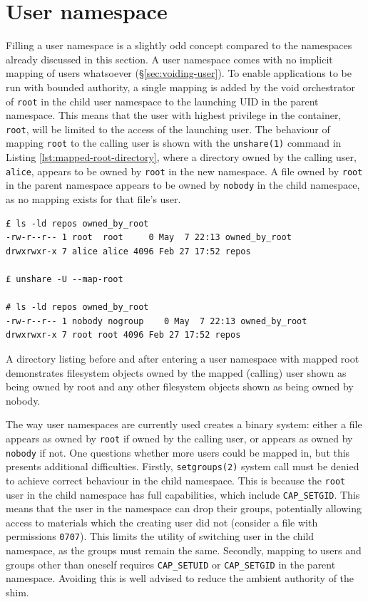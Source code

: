 \documentclass[12pt,a4paper,twoside]{report}
\begin{document}
\section{User namespace}
\label{sec:filling-user}

Filling a user namespace is a slightly odd concept compared to the namespaces already discussed in this section. A user namespace comes with no implicit mapping of users whatsoever (§\ref{sec:voiding-user}). To enable applications to be run with bounded authority, a single mapping is added by the void orchestrator of \texttt{root} in the child user namespace to the launching UID in the parent namespace. This means that the user with highest privilege in the container, \texttt{root}, will be limited to the access of the launching user. The behaviour of mapping \texttt{root} to the calling user is shown with the \texttt{unshare(1)} command in Listing \ref{lst:mapped-root-directory}, where a directory owned by the calling user, \texttt{alice}, appears to be owned by \texttt{root} in the new namespace. A file owned by \texttt{root} in the parent namespace appears to be owned by \texttt{nobody} in the child namespace, as no mapping exists for that file's user.

\begin{listing}
\begin{verbatim}
£ ls -ld repos owned_by_root
-rw-r--r-- 1 root  root     0 May  7 22:13 owned_by_root
drwxrwxr-x 7 alice alice 4096 Feb 27 17:52 repos

£ unshare -U --map-root

# ls -ld repos owned_by_root
-rw-r--r-- 1 nobody nogroup    0 May  7 22:13 owned_by_root
drwxrwxr-x 7 root root 4096 Feb 27 17:52 repos
\end{verbatim}

\caption{A directory listing before and after entering a user namespace with mapped root demonstrates filesystem objects owned by the mapped (calling) user shown as being owned by root and any other filesystem objects shown as being owned by nobody.}
\label{lst:mapped-root-directory}
\end{listing}

The way user namespaces are currently used creates a binary system: either a file appears as owned by \texttt{root} if owned by the calling user, or appears as owned by \texttt{nobody} if not. One questions whether more users could be mapped in, but this presents additional difficulties. Firstly, \texttt{setgroups(2)} system call must be denied to achieve correct behaviour in the child namespace. This is because the \texttt{root} user in the child namespace has full capabilities, which include \texttt{CAP\_SETGID}. This means that the user in the namespace can drop their groups, potentially allowing access to materials which the creating user did not (consider a file with permissions \texttt{0707}). This limits the utility of switching user in the child namespace, as the groups must remain the same. Secondly, mapping to users and groups other than oneself requires \texttt{CAP\_SETUID} or \texttt{CAP\_SETGID} in the parent namespace. Avoiding this is well advised to reduce the ambient authority of the shim.
\end{document}
